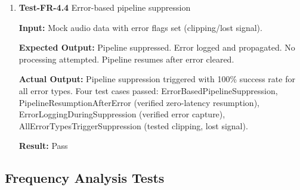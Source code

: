 \documentclass[12pt, titlepage]{article}
\begin{document}
\begin{enumerate}
\textbf{Actual Output:}
Components executed in correct sequence: DOA (order=1), classification
(order=2), send packets (order=3). Two test cases passed: PipelineFlowOrdering
verified execution sequence, PipelineDataIntegrity verified data passed
correctly between stages (input frequency value preserved through all
components).

\textbf{Result:} Pass

\item{\textbf{Test-FR-4.4} Error-based pipeline suppression \\}

\textbf{Input:}
Mock audio data with error flags set (clipping/lost signal).

\textbf{Expected Output:}
Pipeline suppressed. Error logged and propagated. No processing attempted.
Pipeline resumes after error cleared.

\textbf{Actual Output:}
Pipeline suppression triggered with 100\% success rate for all error types. Four
test cases passed: ErrorBasedPipelineSuppression, PipelineResumptionAfterError
(verified zero-latency resumption), ErrorLoggingDuringSuppression (verified
error capture), AllErrorTypesTriggerSuppression (tested clipping, lost signal).

\textbf{Result:} Pass

\end{enumerate}

\subsection{Frequency Analysis Tests}
\end{document}
